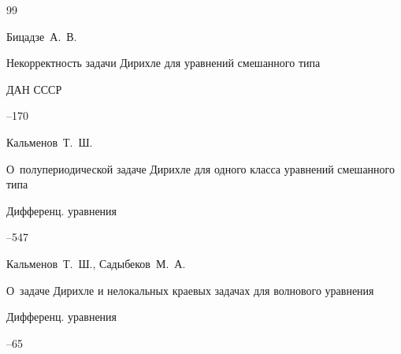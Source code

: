 \begin{thebibliography}{99}




\by Бицадзе~А.~В.

\paper Некорректность задачи Дирихле для уравнений смешанного типа

\jour ДАН СССР




--170







\by Кальменов~Т.~Ш.

\paper О~полупериодической задаче Дирихле для одного класса уравнений смешанного типа

\jour Дифференц. уравнения




--547









\by Кальменов~Т.~Ш., Садыбеков~М.~А.

\paper О~задаче Дирихле и нелокальных краевых задачах для волнового уравнения

\jour Дифференц. уравнения




--65






\end{thebibliography}
